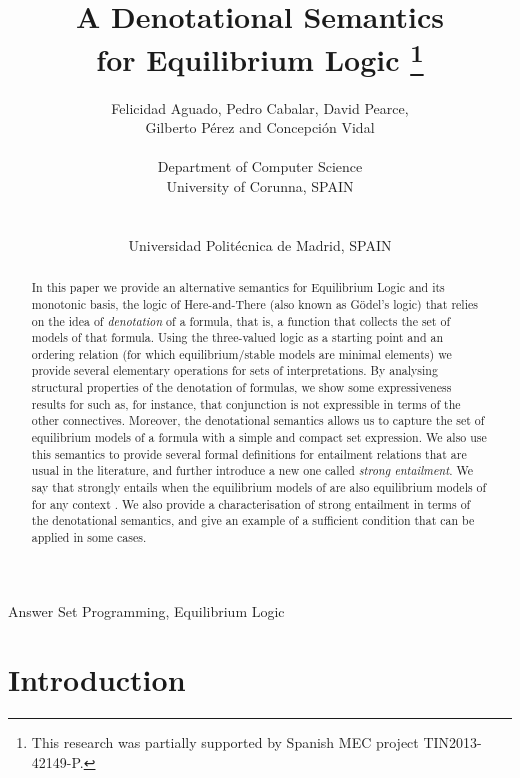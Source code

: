 \documentclass{tlp}
\title[Theory and Practice of Logic Programming]
      {A Denotational Semantics \\ for Equilibrium Logic \thanks{This research was partially supported by Spanish MEC project TIN2013-42149-P.}}
\author[F. Aguado et al]
         {Felicidad Aguado, Pedro Cabalar, David Pearce, \\ 
         {\rm \normalsize Gilberto P\'erez and Concepci\'on Vidal}\\ \\
          Department of Computer Science\\
         University of Corunna, SPAIN\\
         \email{\{aguado,cabalar,gperez,eicovima\}@udc.es}\\
\\
          Universidad Polit\'ecnica de Madrid, SPAIN\\
         \email{david.pearce@upm.es}
		 }
\begin{document}
\label{firstpage}

\maketitle

\begin{abstract}
In this paper we provide an alternative semantics for Equilibrium Logic and its monotonic basis, the logic of Here-and-There (also known as G\"odel's  logic) that relies on the idea of \emph{denotation} of a formula, that is, a function that collects the set of models of that formula. Using the three-valued logic  as a starting point and an ordering relation (for which equilibrium/stable models are minimal elements) we provide several elementary operations for sets of interpretations. By analysing structural properties of the denotation of formulas, we show some expressiveness results for  such as, for instance, that conjunction is not expressible in terms of the other connectives. Moreover, the denotational semantics allows us to capture the set of equilibrium models of a formula with a simple and compact set expression. We also use this semantics to provide several formal definitions for entailment relations that are usual in the literature, and further introduce a new one called \emph{strong entailment}. We say that  strongly entails  when the equilibrium models of  are also equilibrium models of  for any context . We also provide a characterisation of strong entailment in terms of the denotational semantics, and give an example of a sufficient condition that can be applied in some cases.
\end{abstract}

\begin{keywords}
Answer Set Programming, Equilibrium Logic
\end{keywords}

\section{Introduction}
\end{document}

